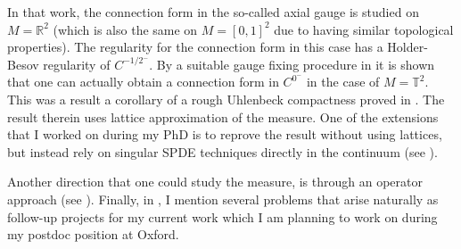 \documentclass[12pt]{article}
\numberwithin{equation}{section}
\theoremstyle{definition}
\theoremstyle{remark}
\newcommand{\diff}{\mathrm{d}}
\newcommand{\R}{\mathbb R}
\newcommand{\1}{\mathbf 1}
\newcommand{\<}{\langle}
\renewcommand{\>}{\rangle}
\newcommand{\bT}{\mathbb T}
\begin{document}
%
%
%
%
%
%
In that work, the connection form in the so-called axial gauge is studied on $M=\R^2$ (which is also the same on $M=[0,1]^2$ due to having similar topological properties).
The regularity for the connection form in this case has a Holder-Besov regularity of $C^{-1/2^-}$. By a suitable gauge fixing procedure in \cite{Chevyrev19} it is shown that one can actually obtain a connection form in $C^{0^-}$ in the case of $M=\bT^2$. This was a result a corollary of a rough Uhlenbeck compactness proved in \cite{Chevyrev19}. The result therein uses lattice approximation of the measure. One of the extensions that I worked on during my PhD is to reprove the result without using lattices, but instead rely on singular SPDE techniques directly in the continuum (see  ). 
%

Another direction that one could study the measure, is through an operator approach (see ). 
%
%
Finally, in , I mention several problems that arise naturally as follow-up projects for my current work which I am planning to work on during my postdoc position at Oxford.   
\end{document}
